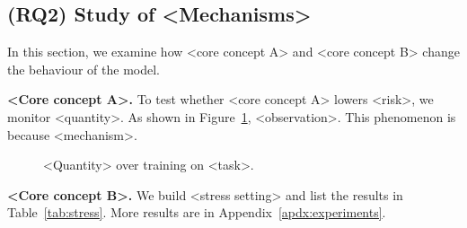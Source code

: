 \subsection{(RQ2) Study of <Mechanisms>} \label{sec:mechanism}
In this section, we examine how <core concept A> and <core concept B> change the behaviour of the model.

\textbf{<Core concept A>.} To test whether <core concept A> lowers <risk>, we monitor <quantity>.
As shown in Figure~\ref{fig:dynamics}, <observation>.
This phenomenon is because <mechanism>.

\begin{figure}[t]
    \centering
    \caption{<Quantity> over training on <task>.}
    \label{fig:dynamics}
\end{figure}

\textbf{<Core concept B>.} We build <stress setting> and list the results in Table~\ref{tab:stress}.
More results are in Appendix~\ref{apdx:experiments}.

\begin{table}[t]
\centering
\renewcommand{\arraystretch}{0.9}
\caption{Quality and cost under <stress setting>.}
\label{tab:stress}
\vspace{-10pt}
\end{table}

